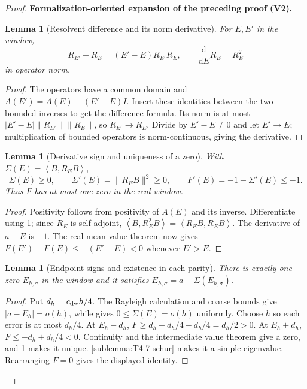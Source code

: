 \documentclass[11pt]{article}
\newtheorem{lemma}[theorem]{Lemma}
\newcommand{\formalisationparentid}{X}
\newenvironment{formalisationaddition}[1]{\par\medskip\begingroup\color{blue}\def\formalisationparentid{#1}\setcounter{formalizationsublemma}{0}\let\lemma\formalizationsublemma\let\endlemma\endformalizationsublemma
  \def\Eo{\mathcal E_h^\circ}\def\EE{\mathcal E_h}\def\phio{\phi_h^\circ}\def\phih{\phi_h}\def\Ho{H_h^{\rm atom}(v^\circ)}\def\Ha{H_h^{\rm atom}}\def\HL{H_h^{L}}\def\Dh{D_h}\def\Log{\operatorname{Log}}\def\ellh{\ell_h}\def\Gp{G_{p,h}}\def\Ast{A_{*,h}}\def\ahat{\widehat{\mathfrak a}_h}\def\ah{\mathfrak a_h}\def\rh{\widehat\rho_h}\def\deltah{\widehat\delta_h}\def\oldref##1{\textup{(##1)}}\def\interface##1{\par\noindent\textit{Analytical interface used here.} ##1\par}\def\finish{\par\noindent\textit{Conclusion of the formalization-oriented expansion.} }\par\noindent\textbf{Formalization-oriented expansion of the preceding proof (V2).}\par\smallskip
}{\par\endgroup\medskip
}
\newcommand{\ip}[2]{\left\langle #1,#2\right\rangle}
\begin{document}
\begin{proof}
\begin{formalisationaddition}{T4.7}
\begin{lemma}[Resolvent difference and its norm derivative]\label{sublemma:T4-7-resolvent-difference}
For $E,E'$ in the window,
\[
 R_{E'}-R_E=(E'-E)R_{E'}R_E,\qquad \frac{\mathrm d}{\mathrm dE}R_E=R_E^2
\]
in operator norm.
\end{lemma}
\begin{proof}
The operators have a common domain and
$A(E')=A(E)-(E'-E)I$. Insert these identities between the two bounded
inverses to get the difference formula. Its norm is at most
$|E'-E|\|R_{E'}\|\|R_E\|$, so $R_{E'}\to R_E$.
Divide by $E'-E\ne0$ and let $E'\to E$; multiplication of bounded
operators is norm-continuous, giving the derivative.
\end{proof}

\begin{lemma}[Derivative sign and uniqueness of a zero]\label{sublemma:T4-7-monotonicity}
With $\Sigma(E)=\ip B{R_EB}$,
\[
 \Sigma(E)\ge0,\qquad \Sigma'(E)=\|R_EB\|^2\ge0,
 \qquad F'(E)=-1-\Sigma'(E)\le-1.
\]
Thus $F$ has at most one zero in the real window.
\end{lemma}
\begin{proof}
Positivity follows from positivity of $A(E)$ and its inverse.
Differentiate using \ref{sublemma:T4-7-resolvent-difference}; since
$R_E$ is self-adjoint, $\ip B{R_E^2B}=\ip{R_EB}{R_EB}$.
The derivative of $a-E$ is $-1$. The real mean-value theorem now gives
$F(E')-F(E)\le-(E'-E)<0$ whenever $E'>E$.
\end{proof}

\begin{lemma}[Endpoint signs and existence in each parity]\label{sublemma:T4-7-existence}
There is exactly one zero $E_{h,\sigma}$ in the window and it satisfies
$E_{h,\sigma}=a-\Sigma(E_{h,\sigma})$.
\end{lemma}
\begin{proof}
Put $d_h=c_{\rm dw}h/4$. The Rayleigh calculation and coarse bounds give
$|a-E_h|=o(h)$, while  gives
$0\le\Sigma(E)=o(h)$ uniformly. Choose $h$ so each error is at most
$d_h/4$. At $E_h-d_h$, $F\ge d_h-d_h/4-d_h/4=d_h/2>0$.
At $E_h+d_h$, $F\le-d_h+d_h/4<0$.
Continuity and the intermediate value theorem give a zero, and
\ref{sublemma:T4-7-monotonicity} makes it unique.
\ref{sublemma:T4-7-schur} makes it a simple eigenvalue. Rearranging
$F=0$ gives the displayed identity.
\end{proof}


\end{formalisationaddition}
\end{proof}
\end{document}
